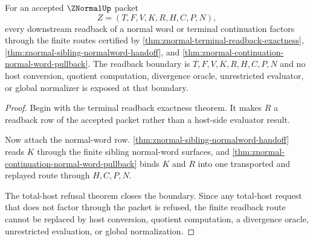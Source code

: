 \begin{theorem}
\label{thm:znormal-finite-route-readback-boundary}
For an accepted $\ZNormalUp$ packet
$$
Z=(T,F,V,K,R,H,C,P,N),
$$
every downstream readback of a normal word or terminal continuation factors through the finite routes certified by \autoref{thm:znormal-terminal-readback-exactness}, \autoref{thm:znormal-sibling-normalword-handoff}, and \autoref{thm:znormal-continuation-normal-word-pullback}. The readback boundary is $T,F,V,K,R,H,C,P,N$ and no host conversion, quotient computation, divergence oracle, unrestricted evaluator, or global normalizer is exposed at that boundary.
\end{theorem}
\begin{proof}
Begin with the terminal readback exactness theorem. It makes $R$ a readback row of the accepted packet rather than a host-side evaluator result.

Now attach the normal-word row. \autoref{thm:znormal-sibling-normalword-handoff} reads $K$ through the finite sibling normal-word surfaces, and \autoref{thm:znormal-continuation-normal-word-pullback} binds $K$ and $R$ into one transported and replayed route through $H,C,P,N$.

The total-host refusal theorem closes the boundary. Since any total-host request that does not factor through the packet is refused, the finite readback route cannot be replaced by host conversion, quotient computation, a divergence oracle, unrestricted evaluation, or global normalization.
\end{proof}

